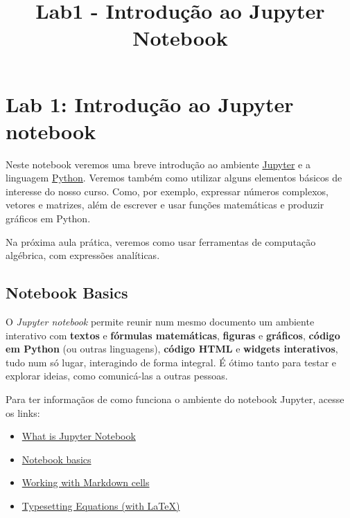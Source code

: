 \documentclass[11pt]{article}
\title{Lab1 - Introdução ao Jupyter Notebook}
\providecommand{\tightlist}{%
      \setlength{\itemsep}{0pt}\setlength{\parskip}{0pt}}
\begin{document}
    
    \maketitle
    
    

    
    \hypertarget{lab-1-introduuxe7uxe3o-ao-jupyter-notebook}{%
\section{Lab 1: Introdução ao Jupyter
notebook}\label{lab-1-introduuxe7uxe3o-ao-jupyter-notebook}}

Neste notebook veremos uma breve introdução ao ambiente
\href{https://jupyter.org/}{Jupyter} e a linguagem
\href{https://docs.python.org/pt-br/3.7/tutorial/index.html}{Python}.
Veremos também como utilizar alguns elementos básicos de interesse do
nosso curso. Como, por exemplo, expressar números complexos, vetores e
matrizes, além de escrever e usar funções matemáticas e produzir
gráficos em Python.

Na próxima aula prática, veremos como usar ferramentas de computação
algébrica, com expressões analíticas.

    \hypertarget{notebook-basics}{%
\subsection{Notebook Basics}\label{notebook-basics}}

O \emph{Jupyter notebook} permite reunir num mesmo documento um ambiente
interativo com \textbf{textos} e \textbf{fórmulas matemáticas},
\textbf{figuras} e \textbf{gráficos}, \textbf{código em Python} (ou
outras linguagens), \textbf{código HTML} e \textbf{widgets interativos},
tudo num só lugar, interagindo de forma integral. É ótimo tanto para
testar e explorar ideias, como comunicá-las a outras pessoas.

Para ter informaçãos de como funciona o ambiente do notebook Jupyter,
acesse os links:

\begin{itemize}
\tightlist
\item
  \href{https://nbviewer.jupyter.org/github/jupyter/notebook/blob/master/docs/source/examples/Notebook/What\%20is\%20the\%20Jupyter\%20Notebook.ipynb}{What
  is Jupyter Notebook}
\item
  \href{https://nbviewer.jupyter.org/github/jupyter/notebook/blob/master/docs/source/examples/Notebook/Notebook\%20Basics.ipynb}{Notebook
  basics}
\item
  \href{https://nbviewer.jupyter.org/github/jupyter/notebook/blob/master/docs/source/examples/Notebook/Working\%20With\%20Markdown\%20Cells.ipynb}{Working
  with Markdown cells}
\item
  \href{https://nbviewer.jupyter.org/github/jupyter/notebook/blob/master/docs/source/examples/Notebook/Typesetting\%20Equations.ipynb}{Typesetting
  Equations (with LaTeX)}
\end{itemize}
\end{document}
